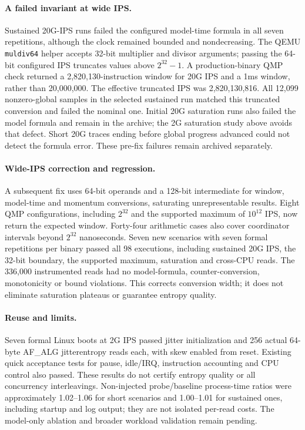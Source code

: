 \paragraph{A failed invariant at wide IPS.}
Sustained 20G-IPS runs failed the configured model-time formula in all seven
repetitions, although the clock remained bounded and nondecreasing. The QEMU
\texttt{muldiv64} helper accepts 32-bit multiplier and divisor arguments; passing
the 64-bit configured IPS truncates values above $2^{32}-1$. A production-binary
QMP check returned a 2,820,130-instruction window for 20G IPS and a 1ms window,
rather than 20,000,000. The effective truncated IPS was 2,820,130,816. All 12,099
nonzero-global samples in the selected sustained run matched this truncated
conversion and failed the nominal one. Initial 20G saturation runs also failed
the model formula and remain in the archive; the 2G saturation study above avoids
that defect. Short 20G traces ending before global progress advanced could not
detect the formula error. These pre-fix failures remain archived separately.

\paragraph{Wide-IPS correction and regression.}
A subsequent fix uses 64-bit operands and a 128-bit intermediate for window,
model-time and momentum conversions, saturating unrepresentable results.
Eight QMP configurations, including $2^{32}$ and the supported maximum of
$10^{12}$ IPS, now return the expected window. Forty-four arithmetic cases also
cover coordinator intervals beyond $2^{32}$ nanoseconds. Seven new scenarios
with seven formal repetitions per binary passed all 98 executions, including
sustained 20G IPS, the 32-bit boundary, the supported maximum, saturation and
cross-CPU reads. The 336,000 instrumented reads had no model-formula,
counter-conversion, monotonicity or bound violations. This corrects conversion
width; it does not eliminate saturation plateaus or guarantee entropy quality.

\paragraph{Reuse and limits.}
Seven formal Linux boots at 2G IPS passed jitter initialization and 256 actual
64-byte AF\_ALG jitterentropy reads each, with skew enabled from reset. Existing
quick acceptance tests for pause, idle/IRQ, instruction accounting and CPU control
also passed. These results do not certify entropy quality or all concurrency
interleavings. Non-injected probe/baseline process-time ratios were approximately
1.02--1.06 for short scenarios and 1.00--1.01 for sustained ones, including startup
and log output; they are not isolated per-read costs. The model-only ablation and
broader workload validation remain pending.

